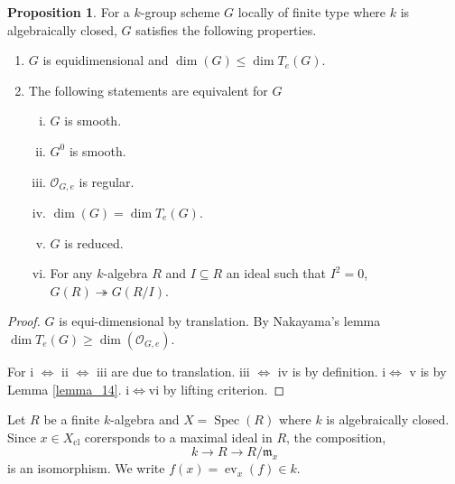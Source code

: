 \documentclass[10pt]{article}
\numberwithin{equation}{section}
\theoremstyle{definition}
\newtheorem{proposition}{Proposition}[section]
\DeclareMathOperator{\ev}{ev}
\DeclareMathOperator{\Spec}{Spec}
\newcommand{\m}[0]{\mathfrak{m}}
\newcommand{\cO}[0]{\mathcal{O}}
\begin{document}
\begin{proposition}
    \label{proposition_18}
    For a $k$-group scheme $G$ locally of finite type where $k$ is algebraically closed, $G$ satisfies the following properties.
    \begin{enumerate}[1. ]
        \item $G$ is equidimensional and $\dim(G) \leq \dim T_e(G)$.
        \item The following statements are equivalent for $G$
        \begin{enumerate}[i. ]
            \item $G$ is smooth.
            \item $G^0$ is smooth.
            \item $\cO_{G,e}$ is regular.
            \item $\dim(G) = \dim T_e(G)$.
            \item $G$ is reduced.
            \item For any $k$-algebra $R$ and $I\subseteq R$ an ideal such that $I^2 = 0$, $G(R)\twoheadrightarrow G(R/I)$.
        \end{enumerate}
    \end{enumerate}
\end{proposition}
\begin{proof}
    $G$ is equi-dimensional by translation. By Nakayama's lemma $\dim T_e(G)\geq \dim(\cO_{G,e})$. 
    \par For i $\iff$ ii $\iff$ iii are due to translation. iii $\iff$ iv is by definition. i$\iff$ v is by Lemma \ref{lemma_14}. i$\iff$vi by lifting criterion.
\end{proof}
Let $R$ be a finite $k$-algebra and $X=\Spec(R)$ where $k$ is algebraically closed. Since $x\in X_{\mathrm{cl}}$ corersponds to a maximal ideal in $R$, the composition,
\begin{equation*}
    k\to R\to R/\m_x
\end{equation*}
is an isomorphism. We write $f(x) = \ev_x(f)\in k$. 
\end{document}
